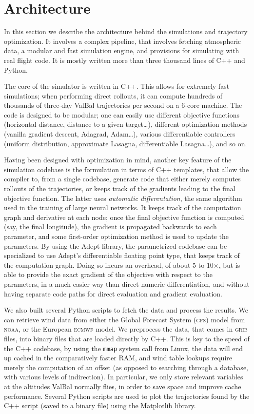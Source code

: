 \documentclass[11pt]{scrartcl} %
\begin{document}
\clearpage
\newpage
\section{Architecture}
\label{arch}
In this section we describe the architecture behind the simulations and trajectory optimization. It involves a complex pipeline, that involves fetching atmospheric data, a modular and fast simulation engine, and provisions for simulating with real flight code. It is mostly written more than three thousand lines of C++ and Python.

The core of the simulator is written in C++. This allows for extremely fast simulations; when performing direct rollouts, it can compute hundreds of thousands of three-day ValBal trajectories per second on a 6-core machine. The code is designed to be modular; one can easily use different objective functions (horizontal distance, distance to a given target\dots), different optimization methods (vanilla gradient descent, Adagrad, Adam\dots), various differentiable controllers (uniform distribution, approximate Lasagna, differentiable Lasagna\dots), and so on.

Having been designed with optimization in mind, another key feature of the simulation codebase is the formulation in terms of C++ templates, that allow the compiler to, from a single codebase, generate code that either merely computes rollouts of the trajectories, or keeps track of the gradients leading to the final objective function. The latter uses \emph{automatic differentation}, the same algorithm used in the training of large neural networks. It keeps track of the computation graph and derivative at each node; once the final objective function is computed (say, the final longitude), the gradient is propagated backwards to each parameter, and some first-order optimization method is used to update the parameters. By using the Adept library, the parametrized codebase can be specialized to use Adept's differentiable floating point type, that keeps track of the computation graph. Doing so incurs an overhead, of about 5 to 10$\times$, but is able to provide the exact gradient of the objective with respect to the parameters, in a much easier way than direct numeric differentiation, and without having separate code paths for direct evaluation and gradient evaluation.

We also built several Python scripts to fetch the data and process the results. We can retrieve wind data from either the Global Forecast System (\textsc{gfs}) model from \textsc{noaa}, or the European \textsc{ecmwf} model. We preprocess the data, that comes in \textsc{grib} files, into binary files that are loaded directly by C++. This is key to the speed of the C++ codebase, by using the \texttt{mmap} system call from Linux, the data will end up cached in the comparatively faster RAM, and wind table lookups require merely the computation of an offset (as opposed to searching through a database, with various levels of indirection). In particular, we only store relevant variables at the altitudes ValBal normally flies, in order to save space and improve cache performance. Several Python scripts are used to plot the trajectories found by the C++ script (saved to a binary file) using the Matplotlib library.

\newpage
\printbibliography
\end{document}
